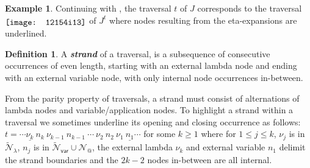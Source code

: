 \documentclass[xchauthor,chkrefs,GCNS,amsmath,amsthm,rotating,leaveRGB]{tcsg}
\makeatletter
\renewcommand{\index}[1]{}
\theoremstyle{plain}
\theoremstyle{definition}
\newtheorem{definition}{Definition}[section]
\newtheorem{example}{Example}[section]
\newcommand{\Nodes}{\mathcal{N}}
\newcommand{\NodesApp}{\Nodes_@}
\newcommand{\ExtendedNodesVar}{\tilde{\Nodes}_{\mathsf{var}}}
\newcommand{\ExtendedNodesLmd}{\tilde{\Nodes}_{\lambda}}
\newcommand{\ctree}{\Tau}
\makeatother
\begin{document}
%
%
%
%
\begin{example}
Continuing with ,
the traversal $t$ of $J$ corresponds to the
traversal\\
$\raisebox{-2pt}{\texttt{[image: 12154i13]}}$ of $J^{t}$ where nodes resulting from the
eta-expansions are underlined.
\end{example}

\begin{definition}\label{ref:strand}
A \textbf{\emph{strand}}\index{strand} of a traversal, is a subsequence of
consecutive occurrences of even length, starting with an external lambda node
and ending with an external variable node, with only internal node
occurrences in-between.

From the parity property of traversals, a strand must consist of alternations
of lambda nodes and variable/application nodes. To highlight a strand within
a traversal we sometimes underline its opening and closing occurrence as
follows: $ t = \cdots \underline{\nu _{k}}\ n_{k}\ \nu _{k-1}\ n_{k-1}\
\cdots \ \nu _{2}\ n_{2}\ \nu _{1}\ \underline{n_{1}} \cdots $ for some
$k\geq 1$ where for $1 \leq j \leq k$, $\nu _{j}$ is in $\ExtendedNodesLmd $,
$n_{j}$ is in $\ExtendedNodesVar \cup  \NodesApp $, the external lambda $\nu
_{k}$ and external variable $n_{1}$ delimit the strand boundaries and the
$2k-2$ nodes in-between are all internal.
\end{definition}
\end{document}
